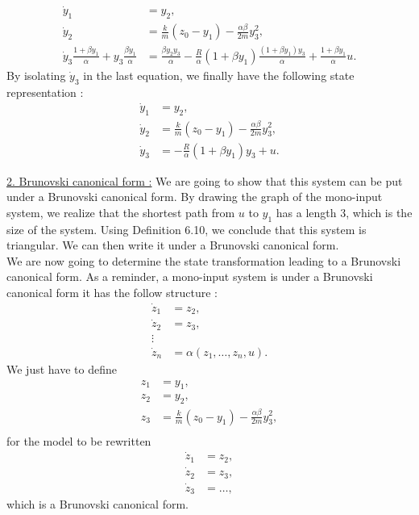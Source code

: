 \begin{align*}
\dot{y}_1 & = y_2, \\
\dot{y}_2 & = \frac{k}{m}(z_0-y_1)-\frac{\alpha \beta}{2m}y_3^2, \\
\dot{y}_3\frac{1+\beta y_1}{\alpha} + y_3\frac{\beta \dot{y}_1}{\alpha} & = \frac{\beta y_2 y_3}{\alpha}-\frac{R}{\alpha}(1+\beta y_1)\frac{(1+\beta y_1)y_3}{\alpha} + \frac{1+\beta y_1}{\alpha}u.
\end{align*}
By isolating $\dot{y}_3$ in the last equation, we finally have the following state representation :
\begin{align*}
\dot{y}_1 & = y_2, \\
\dot{y}_2 & = \frac{k}{m}(z_0-y_1)-\frac{\alpha \beta}{2m}y_3^2, \\
\dot{y}_3 & = -\frac{R}{\alpha}(1+\beta y_1)y_3 + u.
\end{align*}

\underline{2. Brunovski canonical form :}
We are going to show that this system can be put under a Brunovski canonical form. By drawing the graph of the mono-input system, we realize that the shortest path from $u$ to $y_1$ has a length $3$, which is the size of the system. Using Definition 6.10, we conclude that this system is triangular. We can then write it under a Brunovski canonical form.\\
We are now going to determine the state transformation leading to a Brunovski canonical form. As a reminder, a mono-input system is under a Brunovski canonical form it has the follow structure :
\begin{align*}
\dot{z}_1 & = z_2, \\
\dot{z}_2 & = z_3, \\
\vdots \\
\dot{z}_n & = \alpha(z_1,\hdots,z_n,u).
\end{align*}
We just have to define
\begin{align*}
z_1 & = y_1,\\ 
z_2 & = y_2,\\
z_3 & = \frac{k}{m}(z_0-y_1)-\frac{\alpha \beta}{2m}y_3^2,\\
\end{align*}
for the model to be rewritten
\begin{align*}
\dot{z}_1 & = z_2,\\
\dot{z}_2 & = z_3,\\
\dot{z}_3 & = \hdots,
\end{align*}
which is a Brunovski canonical form.

